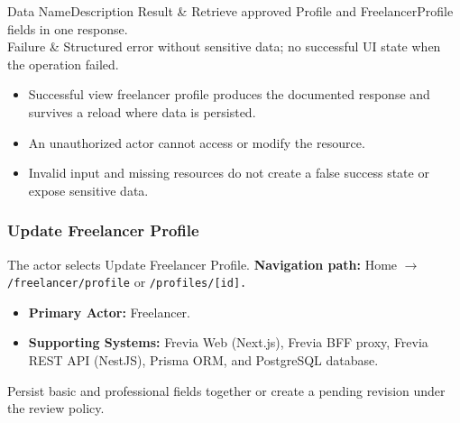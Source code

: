 \begin{specdatatable}{Data Name}{Description}
Result & Retrieve approved Profile and FreelancerProfile fields in one response.\\ \hline
Failure & Structured error without sensitive data; no successful UI state when the operation failed.\\ \hline
\end{specdatatable}

\begin{itemize}[leftmargin=1.6em,topsep=3pt,itemsep=2pt,parsep=0pt,label=$\bullet$]
    \item Successful view freelancer profile produces the documented response and survives a reload where data is persisted.
    \item An unauthorized actor cannot access or modify the resource.
    \item Invalid input and missing resources do not create a false success state or expose sensitive data.
\end{itemize}

\subsubsection{Update Freelancer Profile}

The actor selects Update Freelancer Profile.\newline
\textbf{Navigation path:} Home $\rightarrow$ \texttt{/\allowbreak{}freelancer/\allowbreak{}profile} or \texttt{/\allowbreak{}profiles/\allowbreak{}[id].}


\begin{itemize}[leftmargin=1.6em,topsep=3pt,itemsep=2pt,parsep=0pt,label=$\bullet$]
    \item \textbf{Primary Actor:} Freelancer.
    \item \textbf{Supporting Systems:} Frevia Web (Next.js), Frevia BFF proxy, Frevia REST API (NestJS), Prisma ORM, and PostgreSQL database.
\end{itemize}

\noindent Persist basic and professional fields together or create a pending revision under the review policy.

